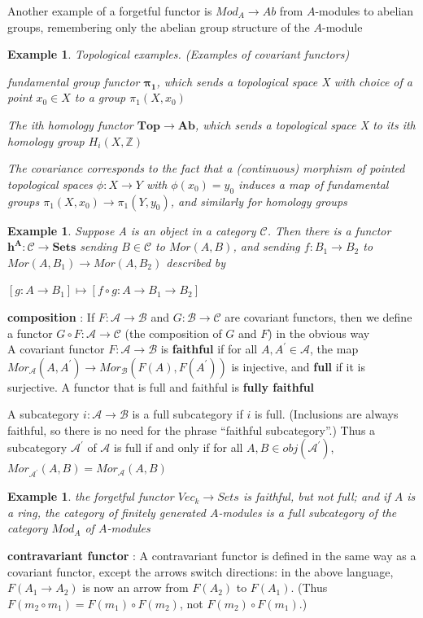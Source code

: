 \documentclass{article}
\newtheorem{example}[theorem]{Example}
\begin{document}
Another example of a forgetful functor is $Mod_A \rightarrow Ab$ from $A$-modules to abelian groups, remembering only the abelian group structure of the $A$-module
\begin{example}
Topological examples. (Examples of covariant functors)

fundamental group functor $\boldsymbol{\pi_1}$, which sends a topological space X with choice of a point $x_0 \in X$ to a group $\pi_1(X, x_0)$

The ith homology functor $\boldsymbol{Top \rightarrow Ab}$, which sends a topological space X to its ith homology group $H_i(X,\mathbb Z)$

The covariance corresponds to the fact that a (continuous) morphism of pointed topological spaces $\phi: X \rightarrow Y$ with $\phi(x_0) = y_0$ induces a map of fundamental groups $\pi_1(X, x_0) \rightarrow \pi_1(Y, y_0)$, and similarly for homology groups
\label{1.10}
\end{example}
\begin{example}
Suppose A is an object in a category $\mathscr C$. Then there is a functor $\boldsymbol{h^A :\mathscr C \rightarrow Sets}$ sending $B \in \mathscr C$ to $Mor(A, B)$, and sending $f : B_1 \rightarrow B_2$ to $Mor(A, B_1) \rightarrow Mor(A, B_2)$ described by
\begin{center}
$[g: A \rightarrow B_1] \mapsto[f \circ g: A \rightarrow B_1 \rightarrow B_2]$
\end{center}
\label{1.11}
\end{example}
\textbf{composition} : If $F: \mathscr A \rightarrow \mathscr B$ and $G: \mathscr B \rightarrow \mathscr C$ are covariant functors, then we
define a functor $G\circ F: \mathscr A \rightarrow \mathscr C$ (the composition of $G$ and $F$) in the obvious way\\

A covariant functor $F: \mathscr A \rightarrow \mathscr B$ is \textbf{faithful} if for all $A, A^\prime \in \mathscr A$, the map $Mor_{\mathscr A} (A, A^\prime) \rightarrow Mor_{\mathscr B}(F(A), F(A^\prime))$ is injective, and \textbf{full} if it is surjective. A functor that is full and faithful is \textbf{fully faithful}

A subcategory $i:\mathscr A \rightarrow \mathscr B$ is a full subcategory if $i$ is full. (Inclusions are always faithful, so there is no need for the phrase “faithful subcategory”.) Thus a subcategory $\mathscr A^\prime$ of $\mathscr A$ is full if and only if for all $A, B \in obj(\mathscr A^\prime)$, $ Mor_{\mathscr A^\prime} (A, B) = Mor_{\mathscr A}(A, B)$
\begin{example}
    the forgetful functor $Vec_k \rightarrow Sets$ is faithful, but not full; and if $A$ is a ring, the category of finitely generated $A$-modules is a full subcategory of the category $Mod_A$ of $A$-modules
\end{example}
\textbf{contravariant functor} : A contravariant functor is defined in the same way as a covariant functor, except the arrows switch directions: in the above language, $F(A_1 \rightarrow A_2)$ is now an arrow from $F(A_2)$ to $F(A_1)$. (Thus $F(m_2 \circ m_1) = F(m_1) \circ F(m_2)$, not
$F(m_2) \circ F(m_1)$.)
\end{document}
